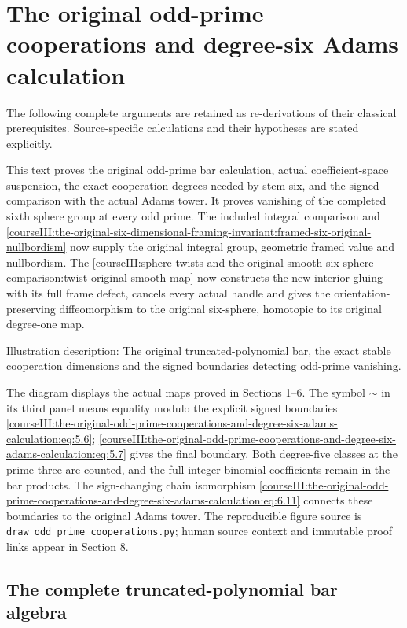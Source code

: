 \section{The original odd-prime cooperations and degree-six Adams calculation}\label{courseIII:the-original-odd-prime-cooperations-and-degree-six-adams-calculation:section}

The following complete arguments are retained as re-derivations of their classical prerequisites. Source-specific calculations and their hypotheses are stated explicitly.

This text proves the original odd-prime bar calculation, actual coefficient-space suspension, the exact cooperation degrees needed by stem six, and the signed comparison with the actual Adams tower. It proves vanishing of the completed sixth sphere group at every odd prime. The included integral comparison and \cref{courseIII:the-original-six-dimensional-framing-invariant:framed-six-original-nullbordism} now supply the original integral group, geometric framed value and nullbordism. The \cref{courseIII:sphere-twists-and-the-original-smooth-six-sphere-comparison:twist-original-smooth-map} now constructs the new interior gluing with its full frame defect, cancels every actual handle and gives the orientation-preserving diffeomorphism to the original six-sphere, homotopic to its original degree-one map.

Illustration description: The original truncated-polynomial bar, the exact stable cooperation dimensions and the signed boundaries detecting odd-prime vanishing.

The diagram displays the actual maps proved in Sections 1--6. The symbol \(\sim\) in its third panel means equality modulo the explicit signed boundaries \eqref{courseIII:the-original-odd-prime-cooperations-and-degree-six-adams-calculation:eq:5.6}; \eqref{courseIII:the-original-odd-prime-cooperations-and-degree-six-adams-calculation:eq:5.7} gives the final boundary. Both degree-five classes at the prime three are counted, and the full integer binomial coefficients remain in the bar products. The sign-changing chain isomorphism \eqref{courseIII:the-original-odd-prime-cooperations-and-degree-six-adams-calculation:eq:6.11} connects these boundaries to the original Adams tower. The reproducible figure source is \texttt{draw\_odd\_prime\_cooperations.py}; human source context and immutable proof links appear in Section 8.

\subsection{The complete truncated-polynomial bar algebra}
\label{courseIII:the-original-odd-prime-cooperations-and-degree-six-adams-calculation:odd-original-bar}

